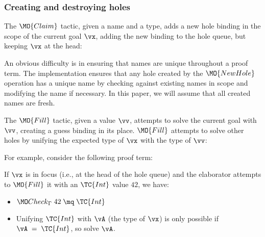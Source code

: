 \subsubsection{Creating and destroying holes}

The $\MO{Claim}$ tactic, given a name and a type, adds a new hole binding in
the scope of the current goal $\vx$, adding the new binding to the hole queue, but
keeping $\vx$ at the head:


An obvious difficulty is in ensuring that names are unique throughout a proof
term.  The implementation ensures that any hole created by the $\MO{NewHole}$
operation has a unique name by checking against existing names in scope and
modifying the name if necessary. In this paper, we will assume that all created
names are fresh.

The $\MO{Fill}$ tactic, given a value $\vv$, attempts to solve the current goal
with $\vv$, creating a guess binding in its place. $\MO{Fill}$ attempts to
solve other holes by unifying the expected type of $\vx$ with the type of $\vv$:


\noindent
For example, consider the following proof term:

\DM{
\AR{
\hole{\va}{\Type}\SC\hole{\vk}{\Nat}\SC
\hole{\vx}{\va}\SC\hole{\vxs}{\Vect\;\vk\;\va}\SC
\\
\hole{\vys}{\Vect\;(\suc\;\vk)\;\va}\SC\vys
}
}

\noindent
If $\vx$ is in focus (i.e., at the head of the hole queue) and the elaborator
attempts to
$\MO{Fill}$ it with an $\TC{Int}$ value $42$, we have:

\begin{itemize}
\item $\Check\;42\;\mq\;\TC{Int}$
\item Unifying $\TC{Int}$ with $\vA$ (the type of $\vx$) is only possible if
$\vA\;=\;\TC{Int}$, so solve $\vA$.
\end{itemize}

